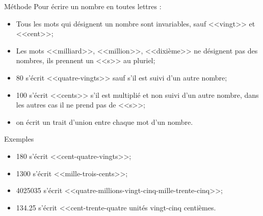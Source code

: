 \documentclass[xcolor={dvipsnames}]{beamer}
\begin{document}
\begin{frame}
	
	
	
	\begin{block}{Méthode}
		Pour \'ecrire un nombre en toutes lettres :\pause
		\begin{itemize}
			\item Tous les mots qui désignent un nombre sont invariables, sauf <<vingt>> et <<cent>>;\pause
			\item Les mots <<milliard>>, <<million>>, <<dixième>> ne désignent pas des nombres, ils prennent un <<s>> au pluriel;\pause
			\item 80 s'écrit <<quatre-vingts>> sauf s'il est suivi d'un autre nombre;\pause
			\item 100 s'écrit <<cents>> s'il est multiplié et non suivi d'un autre nombre, dans les autres cas il ne prend pas de <<s>>;\pause
			\item on écrit un trait d'union entre chaque mot d'un nombre.
		\end{itemize}
	\end{block}
\end{frame}

\begin{frame}
	\begin{exampleblock}{Exemples}
		\begin{itemize}
			\item 180 s'écrit \pause <<cent-quatre-vingts>>;\pause
			\item \num{1300} s'écrit \pause <<mille-trois-cents>>;\pause
			\item \num{4025035} s'écrit \pause <<quatre-millions-vingt-cinq-mille-trente-cinq>>;\pause
			\item \num{134.25} s'écrit \pause <<cent-trente-quatre unités vingt-cinq centièmes.
		\end{itemize}
	\end{exampleblock}
\end{frame}
\end{document}
